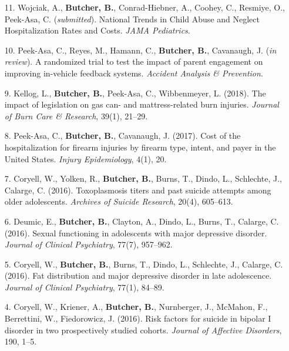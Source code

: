 \documentclass[a4paper]{article}
\begin{document}
\begin{enumerate}

  \item[11.] Wojciak, A., \textbf{Butcher, B.}, Conrad-Hiebner, A., Coohey, C.,
    Resmiye, O., Peek-Asa, C. (\textit{submitted}). National Trends in Child
    Abuse and Neglect Hospitalization Rates and Costs.
    \textit{JAMA Pediatrics}.

  \item[10.] Peek-Asa, C., Reyes, M., Hamann, C., \textbf{Butcher, B.},
    Cavanaugh, J. (\textit{in review}). A randomized trial to test the impact
    of parent engagement on improving in-vehicle feedback systems.
    \textit{Accident Analysis \& Prevention}.

  \item[9.] Kellog, L., \textbf{Butcher, B.}, Peek-Asa, C., Wibbenmeyer, L. (2018).
    The impact of legislation on gas can- and mattress-related
    burn injuries. \textit{Journal of Burn Care \& Research}, 39(1), 21--29.

  \item[8.] Peek-Asa, C., \textbf{Butcher, B.}, Cavanaugh, J. (2017). Cost of the
    hospitalization for firearm injuries by firearm type, intent, and
    payer in the United States. \textit{Injury Epidemiology}, 4(1), 20.

  \item[7.] Coryell, W., Yolken, R., \textbf{Butcher, B.}, Burns, T., Dindo, L., Schlechte,
    J., Calarge, C. (2016). Toxoplasmosis titers and past suicide attempts among
    older adolescents. \textit{Archives of Suicide Research}, 20(4), 605--613.

  \item[6.] Deumic, E., \textbf{Butcher, B.}, Clayton, A., Dindo, L., Burns, T., Calarge,
    C. (2016). Sexual functioning in adolescents with major depressive disorder.
    \textit{Journal of Clinical Psychiatry}, 77(7), 957--962.

  \item[5.] Coryell, W., \textbf{Butcher, B.}, Burns, T., Dindo, L., Schlechte, J.,
    Calarge, C. (2016). Fat distribution and major depressive disorder in
    late adolescence. \textit{Journal of Clinical Psychiatry}, 77(1), 84--89.

  \item[4.] Coryell, W., Kriener, A., \textbf{Butcher, B.}, Nurnberger, J., McMahon, F.,
    Berrettini, W., Fiedorowicz, J. (2016). Risk factors for suicide in bipolar
    I disorder in two prospectively studied cohorts. \textit{Journal of Affective
    Disorders}, 190, 1--5.


\end{enumerate}
\end{document}
